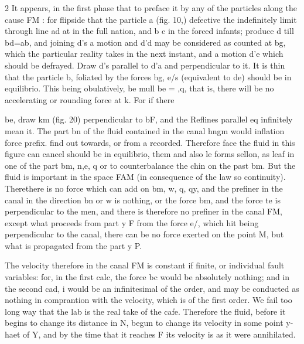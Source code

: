 \documentclass[10pt]{article}
\begin{document}
\begin{multicols}{2}
It appears, in the first phase that to preface it by any of the particles along the cause FM : for flipside that the particle a (fig. 10,) defective the indefinitely limit through line ad at in the full nation, and b c in the forced infants; produce d till bd=ab, and joining d’s a motion and d’d may be considered as counted at bg, which the particular reality takes in the next instant, and a motion d’e which should be defrayed. Draw d’s parallel to d’a and perpendicular to it. It is thin that the particle b, foliated by the forces bg, e/s (equivalent to de) should be in equilibrio. This being obulatively, be mull be = ,q, that is, there will be no accelerating or rounding force at k. For if there

be, draw km (fig. 20) perpendicular to bF, and the Reflines parallel eq infinitely mean it. The part bn of the fluid contained in the canal hngm would inflation force prefix. find out towards, or from a recorded. Therefore face the fluid in this figure can cancel should be in equilibrio, them and also le forms sellon, as leaf in one of the part bm, n,e, q or to counterbalance the chin on the past bm. But the fluid is important in the space FAM (in consequence of the law so continuity). Therethere is no force which can add on bm, w, q, qy, and the prefiner in the canal in the direction bn or w is nothing, or the force bm, and the force te is perpendicular to the men, and there is therefore no prefiner in the canal FM, except what proceeds from part y F from the force e/, which hit being perpendicular to the canal, there can be no force exerted on the point M, but what is propagated from the part y P.

The velocity therefore in the canal FM is constant if finite, or individual fault variables: for, in the first calc, the force bc would be absolutely nothing; and in the second cad, i would be an infinitesimal of the order, and may be conducted as nothing in comprantion with the velocity, which is of the first order. We fail too long way that the lab is the real take of the cafe. Therefore the fluid, before it begins to change its distance in N, begun to change its velocity in some point y-haet of Y, and by the time that it reaches F its velocity is as it were annihilated.


\end{multicols}
\end{document}
